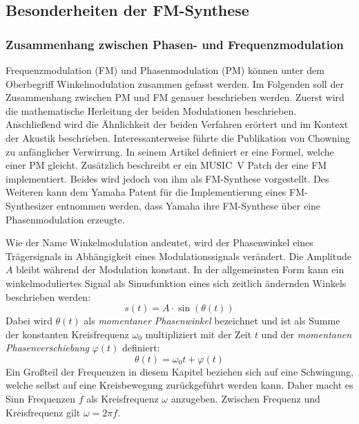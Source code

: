 \subsection{Besonderheiten der FM-Synthese}
\FloatBarrier
\subsubsection{Zusammenhang zwischen Phasen- und Frequenzmodulation}
Frequenzmodulation (FM) und Phasenmodulation (PM) können unter dem Oberbegriff Winkelmodulation zusammen gefasst werden. Im Folgenden soll der Zusammenhang zwischen PM und FM genauer beschrieben werden. Zuerst wird die mathematische Herleitung der beiden Modulationen beschrieben. Anschließend wird die Ähnlichkeit der beiden Verfahren erörtert und im Kontext der Akustik beschrieben.
Interessanterweise führte die Publikation von Chowning zu anfänglicher Verwirrung. In seinem Artikel definiert er eine Formel, welche einer PM gleicht. Zusätzlich beschreibt er ein MUSIC~V Patch der eine FM implementiert. Beides wird jedoch von ihm als FM-Synthese vorgestellt. \cite{rossum1999method} Des Weiteren kann dem Yamaha Patent für die Implementierung eines FM-Synthesizer entnommen werden, dass Yamaha ihre FM-Synthese über eine Phasenmodulation erzeugte. \cite{oya1987electronic} 

Wie der Name Winkelmodulation andeutet, wird der Phasenwinkel eines Trägersignals in Abhängigkeit eines Modulationssignals verändert. Die Amplitude \(A\) bleibt während der Modulation konstant. In der allgemeinsten Form kann ein winkelmoduliertes Signal als Sinusfunktion eines sich zeitlich ändernden Winkels beschrieben werden:
\begin{equation}
s(t)=A\cdot\sin(\theta(t))
\label{eq:signal_basis_funktion}
\end{equation}
Dabei wird \(\theta(t)\) als \textit{momentaner Phasenwinkel} bezeichnet und ist als Summe der konstanten Kreisfrequenz $\omega_0$ multipliziert mit der Zeit $t$ und der \textit{momentanen Phasenverschiebung} $\varphi(t)$ definiert:
\begin{equation*}
\theta(t)=\omega_0t + \varphi(t)
\end{equation*}
Ein Großteil der Frequenzen in diesem Kapitel beziehen sich auf eine Schwingung, welche selbst auf eine Kreisbewegung zurückgeführt werden kann. Daher macht es Sinn Frequenzen $f$ als Kreisfrequenz $\omega$ anzugeben. Zwischen Frequenz und Kreisfrequenz gilt $\omega=2\pi f$.


